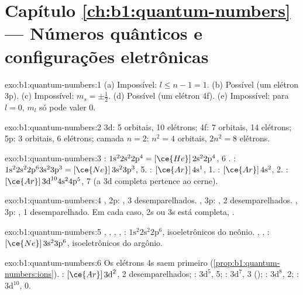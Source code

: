 \section*{Capítulo \ref{ch:b1:quantum-numbers} --- Números quânticos e configurações eletrônicas}

\begin{solution}{exo:b1:quantum-numbers:1}
(a) Impossível: $l \le n - 1 = 1$. (b) Possível (um elétron 3p).
(c) Impossível: $m_s = \pm\tfrac12$. (d) Possível (um elétron 4f).
(e) Impossível: para $l = 0$, $m_l$ só pode valer 0.
\end{solution}

\begin{solution}{exo:b1:quantum-numbers:2}
3d: 5 orbitais, 10 elétrons; 4f: 7 orbitais, 14 elétrons; 5p: 3
orbitais, 6 elétrons; camada $n = 2$: $n^2 = 4$ orbitais, $2n^2 = 8$
elétrons.
\end{solution}

\begin{solution}{exo:b1:quantum-numbers:3}
: $1\text{s}^2 2\text{s}^2 2\text{p}^4 = [\ce{He}]\,2\text{s}^2 2\text{p}^4$,
6 . : $1\text{s}^2 2\text{s}^2 2\text{p}^6 3\text{s}^2
3\text{p}^3 = [\ce{Ne}]\,3\text{s}^2 3\text{p}^3$, 5. : $[\ce{Ar}]\,4\text{s}^1$,
1. : $[\ce{Ar}]\,4\text{s}^2$, 2. : $[\ce{Ar}]\,3\text{d}^{10}
4\text{s}^2 4\text{p}^5$, 7 (a  3d completa pertence ao cerne).
\end{solution}

\begin{solution}{exo:b1:quantum-numbers:4}
, 2p: , 3 desemparelhados. , 3p: , 2
desemparelhados. , 3p: , 1 desemparelhado. Em
cada caso, 2s ou 3s está completa, .
\end{solution}

\begin{solution}{exo:b1:quantum-numbers:5}
, , , , : $1\text{s}^2
2\text{s}^2 2\text{p}^6$, isoeletrônicos do neônio. , ,
: $[\ce{Ne}]\,3\text{s}^2 3\text{p}^6$, isoeletrônicos do
argônio.
\end{solution}

\begin{solution}{exo:b1:quantum-numbers:6}
Os elétrons 4s saem primeiro (\cref{prop:b1:quantum-numbers:ions}).
: $[\ce{Ar}]\,3\text{d}^2$, 2 desemparelhados; :
$3\text{d}^5$, 5; : $3\text{d}^7$, 3 ();
: $3\text{d}^8$, 2; : $3\text{d}^{10}$, 0.
\end{solution}

